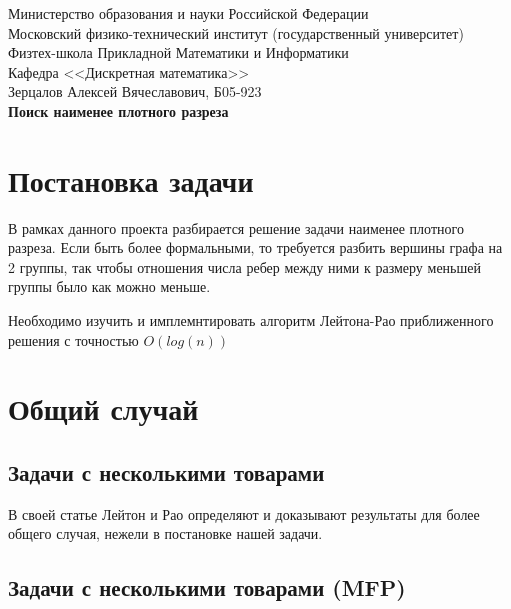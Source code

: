 \documentclass[12pt]{article} %
\begin{document}
{
\thispagestyle{empty}
\begin{center}
    \sc
        Министерство образования и науки Российской Федерации\\
        Московский физико-технический институт
        {\rm(государственный университет)}\\
        Физтех-школа Прикладной Математики и Информатики\\
        Кафедра <<Дискретная математика>>\\
    \rm\large
        Зерцалов Алексей Вячеславович, Б05-923\\[10mm]
    \bf\Large
        Поиск наименее плотного разреза\\[10mm]
\end{center}
}

\newpage
\tableofcontents

\newpage
\section{Постановка задачи}

В рамках данного проекта разбирается решение задачи наименее плотного разреза. Если быть более формальными, то требуется разбить вершины графа на 2 группы, так чтобы отношения числа ребер между ними к размеру меньшей группы было как можно меньше. 

Необходимо изучить и имплемнтировать алгоритм Лейтона-Рао приближенного решения с точностью $O(log(n))$

\section{Общий случай}

\subsection{Задачи с несколькими товарами}

В своей статье Лейтон и Рао определяют и доказывают результаты для более общего случая, нежели в постановке нашей задачи. 

\subsection{Задачи с несколькими товарами (MFP)}
\end{document}
